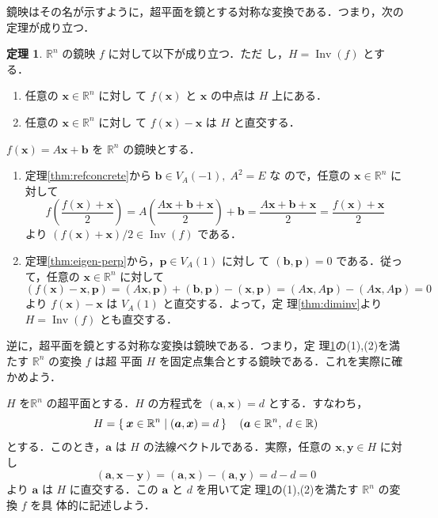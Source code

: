 \documentclass[11pt, uplatex, dvipdfmx, titlepage]{jsarticle}
\makeatletter
\DeclareMathOperator{\Inv}{Inv}
\renewenvironment{proof}[1][\proofname]{\par
  \pushQED{\qed}%
  \normalfont \topsep6\p@\@plus6\p@\relax
  \trivlist
  \item[\hskip\labelsep
         \bfseries
    {#1}]\ignorespaces
}{%
  \popQED\endtrivlist\@endpefalse
}
\theoremstyle{definition}
\newtheorem{theorem}{定理}[section]
\renewcommand{\proofname}{\textbf{証明}}
\makeatother
\begin{document}
鏡映はその名が示すように，超平面を鏡とする対称な変換である．つまり，次の定理が成り立つ．

\begin{theorem}\label{thm:ref_is_sym}
  $\mathbb{R}^n$ の鏡映 $f$ に対して以下が成り立つ．ただ
  し，$H=\Inv(f)$ とする．
  \begin{enumerate}[(1)]
  \item 任意の $\bm{x} \in \mathbb{R}^n$ に対し
    て $f(\bm{x})$ と $\bm{x}$ の中点は $H$ 上にある．
    
  \item 任意の $\bm{x} \in \mathbb{R}^n$ に対し
    て $f(\bm{x})-\bm{x}$ は $H$ と直交する．
  \end{enumerate}  
\end{theorem}

\begin{proof}
  $f(\bm{x}) = A\bm{x}+\bm{b}$ を $\mathbb{R}^n$ の鏡映とする．
  \begin{enumerate}[(1)]
  \item 定理\ref{thm:refconcrete}から $\bm{b} \in V_A(-1), \; A^2=E$ な
    ので，任意の $\bm{x} \in \mathbb{R}^n$ に対して
    \[
      f\left( \frac{f(\bm{x}) + \bm{x}}{2}\right) =
      A\left(\frac{A\bm{x}+\bm{b}+\bm{x}}{2}\right)+\bm{b}
      =\frac{A\bm{x} + \bm{b} + \bm{x}}{2} = \frac{f(\bm{x})+\bm{x}}{2}
    \]
    より $\left(f(\bm{x})+\bm{x}\right)/2 \in \Inv(f)$ である．
    
  \item 定理\ref{thm:eigen-perp}から，$\bm{p} \in V_A(1)$ に対し
    て $(\bm{b}, \bm{p})=0$ である．従って，任意の $\bm{x} \in
    \mathbb{R}^n$ に対して
    \[
      \left(f(\bm{x})-\bm{x}, \bm{p}\right)  =(A\bm{x},\bm{p})+(\bm{b},\bm{p}) - (\bm{x},\bm{p})
      =(A\bm{x}, A\bm{p}) - (A\bm{x}, A\bm{p}) = 0
    \]
    より $f(\bm{x})-\bm{x}$ は $V_A(1)$ と直交する．よって，定
    理\ref{thm:diminv}より $H=\Inv(f)$ とも直交する．
  \end{enumerate}
\end{proof}

逆に，超平面を鏡とする対称な変換は鏡映である．つまり，定
理\ref{thm:ref_is_sym}の(1),(2)を満たす $\mathbb{R}^n$ の変換 $f$ は超
平面 $H$ を固定点集合とする鏡映である．これを実際に確かめよう．

$H$ を$\mathbb{R}^n$ の超平面とする．$H$ の方程式を $(\bm{a}, \bm{x})=d$ とする．すなわち，
\[
  H = \Set{ \bm{x} \in \mathbb{R}^n | (\bm{a} , \bm{x}) = d} \quad
  (\bm{a} \in \mathbb{R}^n, \; d \in \mathbb{R})
\]
とする．このとき，$\bm{a}$ は $H$ の法線ベクトルである．実際，任意の $\bm{x}, \bm{y} \in H$ に対し
\[
  (\bm{a}, \bm{x}-\bm{y}) = (\bm{a}, \bm{x}) - (\bm{a}, \bm{y}) = d-d=0
\]
より $\bm{a}$ は $H$ に直交する．この $\bm{a}$ と $d$ を用いて定
理\ref{thm:ref_is_sym}の(1),(2)を満たす $\mathbb{R}^n$ の変換 $f$ を具
体的に記述しよう．
\end{document}
